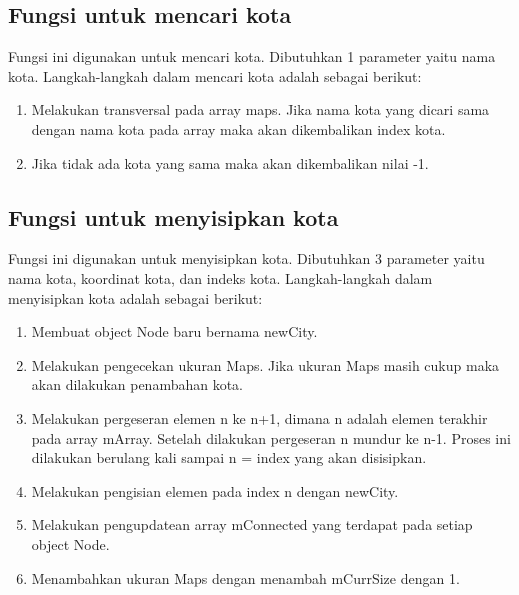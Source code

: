\documentclass[]{article}
\begin{document}
\subsection{Fungsi untuk mencari kota}

\par
Fungsi ini digunakan untuk mencari kota. Dibutuhkan 1 parameter yaitu nama kota. Langkah-langkah dalam mencari kota adalah sebagai berikut:
\begin{enumerate}
    \item Melakukan transversal pada array maps. Jika nama kota yang dicari sama dengan nama kota pada array maka akan dikembalikan index kota.
    \item Jika tidak ada kota yang sama maka akan dikembalikan nilai -1.
\end{enumerate}
\subsection{Fungsi untuk menyisipkan kota}

\par
Fungsi ini digunakan untuk menyisipkan kota. Dibutuhkan 3 parameter yaitu nama kota, koordinat kota, dan indeks kota. Langkah-langkah dalam menyisipkan kota adalah sebagai berikut:
\begin{enumerate}
    \item Membuat object Node baru bernama newCity.
    \item Melakukan pengecekan ukuran Maps. Jika ukuran Maps masih cukup maka akan dilakukan penambahan kota.
    \item Melakukan pergeseran elemen n ke n+1, dimana n adalah elemen terakhir pada array mArray. Setelah dilakukan pergeseran n mundur ke n-1. Proses ini dilakukan berulang kali sampai n = index yang akan disisipkan.
    \item Melakukan pengisian elemen pada index n dengan newCity.
    \item Melakukan pengupdatean array mConnected yang terdapat pada setiap object Node.
    \item Menambahkan ukuran Maps dengan menambah mCurrSize dengan 1.
\end{enumerate}
\end{document}
